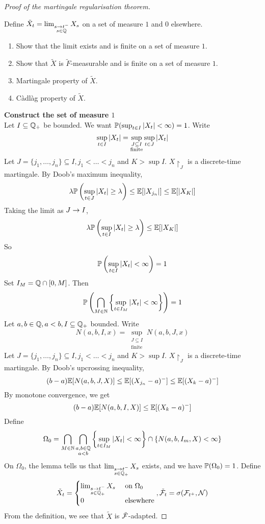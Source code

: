 \documentclass{article}
\begin{document}
\begin{proof}[Proof of the martingale regularisation theorem]
  \begin{goal}
    Define $\tilde X_t = \lim_{\substack{s \mor t^- \\ s \in \Q}} X_s$ on a set of measure $1$ and $0$ elsewhere.
  \end{goal}
  \begin{steps}
    \begin{enumerate}
      \item Show that the limit exists and is finite on a set of measure $1$.
      \item Show that $\tilde X$ is $\tilde F$-measurable and is finite on a set of measure $1$.
      \item Martingale property of $\tilde X$.
      \item Càdlàg property of $\tilde X$.
    \end{enumerate}
  \end{steps}

  {\bf Construct the set of measure $1$} \\
  Let $I \subseteq \Q_+$ be bounded. We want $\P(\sup_{t \in I} \abs{X_t} < \infty) = 1$. Write
  $$\sup_{t \in I} \abs{X_t} = \sup_{\substack{J \subseteq I \\ \text{finite}}} \sup_{t \in J} \abs{X_t}$$
  Let $J = \{j_1, \dots, j_n\} \subseteq I, j_1 < \dots < j_n$ and $K > \sup I$. $X\restriction_J$ is a discrete-time martingale. By Doob's maximum inequality,
  $$\lambda\P\left(\sup_{t \in J} \abs{X_t} \ge \lambda\right) \le \E[\abs{X_{j_n}}] \le \E[\abs{X_K}]$$
  Taking the limit as $J \mor I$,
  $$\lambda\P\left(\sup_{t \in I} \abs{X_t} \ge \lambda\right) \le \E[\abs{X_K}]$$
  So
  $$\P\left(\sup_{t \in I} \abs{X_t} < \infty\right) = 1$$
  Set $I_M = \Q \inter [0, M]$. Then
  $$\P\left(\Inter_{M \in \N} \curlybrack{\sup_{t \in I_M} \abs{X_t} < \infty}\right) = 1$$
  Let $a, b \in \Q, a < b, I \subseteq \Q_+$ bounded. Write
  $$N(a, b, I, x) = \sup_{\substack{J \subseteq I \\ \text{finite}}} N(a, b, J, x)$$
  Let $J = \{j_1, \dots, j_n\} \subseteq I, j_1 < \dots < j_n$ and $K > \sup I$. $X\restriction_J$ is a discrete-time martingale. By Doob's upcrossing inequality,
  $$(b - a)\E[N(a, b, J, X)] \le \E[(X_{j_n} - a)^-] \le \E[(X_k - a)^-]$$
  By monotone convergence, we get 
  $$(b - a)\E[N(a, b, I, X)] \le \E[(X_k - a)^-]$$
  Define
  $$\Omega_0 = \Inter_{M \in \N} \Inter_{\substack{a, b \in \Q \\ a < b}} \curlybrack{\sup_{t \in I_M} \abs{X_t} < \infty} \inter \{N(a, b, I_m, X) < \infty\}$$
  On $\Omega_0$, the lemma tells us that $\lim_{\substack{s \mor t^- \\ s \in \Q_+}} X_s$ exists, and we have $\P(\Omega_0) = 1$. Define
  $$\tilde X_t =
  \begin{cases}
    \lim_{\substack{s \mor t^- \\ s \in \Q_+}} X_s & \text{ on } \Omega_0 \\
    0 & \text{ elsewhere}
  \end{cases}, \tilde\mcF_t = \sigma(\mcF_{t^+}, \mcN)$$
  From the definition, we see that $\tilde X$ is $\tilde\mcF$-adapted.


\end{proof}
\end{document}
